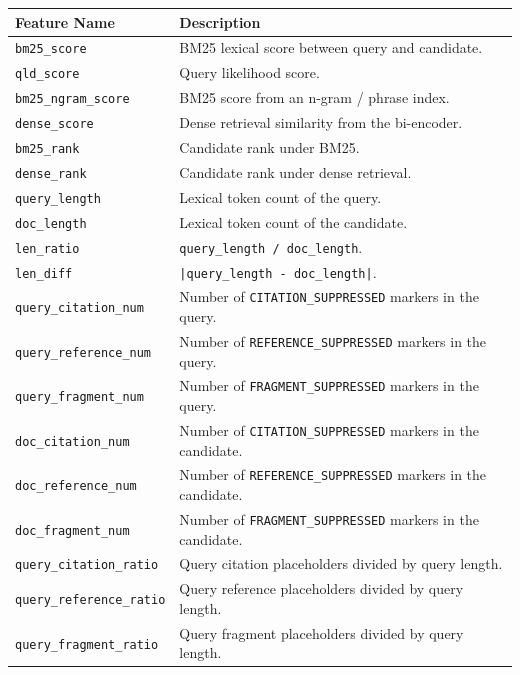 \begin{table}[t]
  \centering
  \scriptsize
  \begin{tabular}{lp{}}
    \toprule
    Feature Name & Description \\
    \midrule
    \texttt{bm25\_score} & BM25 lexical score between query and candidate. \\
    \texttt{qld\_score} & Query likelihood score. \\
    \texttt{bm25\_ngram\_score} & BM25 score from an n-gram / phrase index. \\
    \texttt{dense\_score} & Dense retrieval similarity from the bi-encoder. \\
    \texttt{bm25\_rank} & Candidate rank under BM25. \\
    \texttt{dense\_rank} & Candidate rank under dense retrieval. \\
    \texttt{query\_length} & Lexical token count of the query. \\
    \texttt{doc\_length} & Lexical token count of the candidate. \\
    \texttt{len\_ratio} & \texttt{query\_length / doc\_length}. \\
    \texttt{len\_diff} & \texttt{|query\_length - doc\_length|}. \\
    \texttt{query\_citation\_num} & Number of \texttt{CITATION\_SUPPRESSED} markers in the query. \\
    \texttt{query\_reference\_num} & Number of \texttt{REFERENCE\_SUPPRESSED} markers in the query. \\
    \texttt{query\_fragment\_num} & Number of \texttt{FRAGMENT\_SUPPRESSED} markers in the query. \\
    \texttt{doc\_citation\_num} & Number of \texttt{CITATION\_SUPPRESSED} markers in the candidate. \\
    \texttt{doc\_reference\_num} & Number of \texttt{REFERENCE\_SUPPRESSED} markers in the candidate. \\
    \texttt{doc\_fragment\_num} & Number of \texttt{FRAGMENT\_SUPPRESSED} markers in the candidate. \\
    \texttt{query\_citation\_ratio} & Query citation placeholders divided by query length. \\
    \texttt{query\_reference\_ratio} & Query reference placeholders divided by query length. \\
    \texttt{query\_fragment\_ratio} & Query fragment placeholders divided by query length. \\

\end{tabular}
\end{table}
